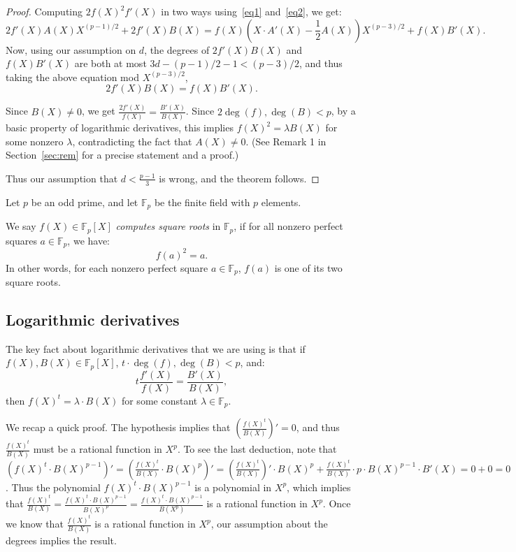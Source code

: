 \documentclass[10pt,a4paper]{article}
\newcommand{\F}{\mathbb{F}}
\begin{document}
\begin{proof}
Computing $2 f(X)^2 f'(X)$ in two ways using~\eqref{eq1} and~\eqref{eq2}, we get:
$$ 2 f'(X) A(X) X^{(p-1)/2} + 2 f'(X) B(X) = f(X) \left(X \cdot A'(X) - \frac{1}{2}A(X)\right) X^{(p-3)/2} + f(X) B'(X).$$
Now, using our assumption on $d$, the degrees of $2 f'(X)B(X)$ and $f(X) B'(X)$ are both at most
$3d - (p-1)/2 - 1 < (p-3)/2$, and thus taking the above equation mod $X^{(p-3)/2}$,
$$ 2f'(X) B(X) = f(X) B'(X).$$

Since $B(X) \neq 0$, we get $\frac{2 f'(X)}{f(X)} = \frac{B'(X)}{B(X)}$. Since $2\deg(f), \deg(B) < p$, by a basic property of logarithmic derivatives, this implies $f(X)^2 = \lambda B(X)$ for some nonzero $\lambda$, contradicting the fact that $A(X) \neq 0$. (See Remark 1 in Section~\ref{sec:rem} for a precise statement and a proof.)


Thus our assumption that $d < \frac{p-1}{3}$ is wrong, and the theorem follows.
\end{proof}

Let $p$ be an odd prime, and let $\F_p$ be the finite field with $p$ elements.

We say $f(X) \in \F_p[X]$ {\em computes square roots} in $\F_p$, if
for all nonzero perfect squares $a \in \F_p$, we have:
$$f(a)^2 = a.$$ In other words, for each nonzero perfect square $a \in \F_p$, $f(a)$ is one of its two square roots.

\subsection*{Logarithmic derivatives}\label{sec:rem}
 The key fact about logarithmic derivatives that we are using is that if 
 $f(X), B(X) \in \F_p[X]$, $t \cdot \deg(f), \deg(B) < p$, and:
 $$ t \frac{f'(X)}{f(X)} = \frac{B'(X)}{B(X)},$$
 then $f(X)^t = \lambda \cdot B(X)$ for some constant $\lambda \in \F_p$. 
 
 We recap a quick proof. The hypothesis implies that $\left( \frac{f(X)^t}{B(X)} \right)' = 0$,
  and thus $\frac{f(X)^t}{B(X)}$ must be a rational function in $X^p$. To see the last deduction, note that $\left(f(X)^t \cdot B(X)^{p-1} \right)' = \left( \frac{f(X)^t}{B(X)} \cdot B(X)^p \right)' = \left( \frac{f(X)^t}{B(X)} \right)' \cdot B(X)^p + \frac{f(X)^t}{B(X)} \cdot p \cdot B(X)^{p-1} \cdot B'(X) = 0 + 0 = 0$. Thus the polynomial $f(X)^t \cdot B(X)^{p-1}$ is a polynomial in $X^p$, which implies that $\frac{f(X)^t}{B(X)} = 
 \frac{f(X)^t \cdot B(X)^{p-1}}{B(X)^p} =
 \frac{f(X)^t \cdot B(X)^{p-1}}{B(X^p)}$ is a rational function in $X^p$. 
 Once we know that $\frac{f(X)^t}{B(X)}$ is a rational function in $X^p$, our assumption about the degrees implies the result. 
\end{document}
